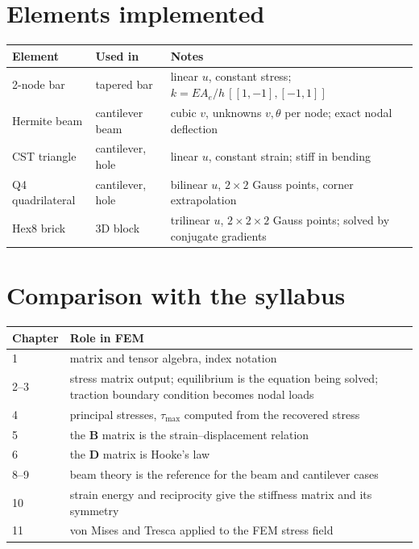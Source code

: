 \documentclass[11pt,a4paper]{article}
\begin{document}
\section{Elements implemented}
\begin{center}\small
\begin{tabular}{@{}lll@{}}\toprule
Element & Used in & Notes\\\midrule
2-node bar & tapered bar & linear $u$, constant stress; $k=EA_e/h\,[[1,-1],[-1,1]]$\\
Hermite beam & cantilever beam & cubic $v$, unknowns $v,\theta$ per node; exact nodal deflection\\
CST triangle & cantilever, hole & linear $u$, constant strain; stiff in bending\\
Q4 quadrilateral & cantilever, hole & bilinear $u$, $2\times2$ Gauss points, corner extrapolation\\
Hex8 brick & 3D block & trilinear $u$, $2\times2\times2$ Gauss points; solved by conjugate gradients\\\bottomrule
\end{tabular}
\end{center}

\section{Comparison with the syllabus}
\begin{center}\small
\begin{tabular}{@{}lp{9cm}@{}}\toprule
Chapter & Role in FEM\\\midrule
1 & matrix and tensor algebra, index notation\\
2--3 & stress matrix output; equilibrium is the equation being solved; traction boundary condition becomes nodal loads\\
4 & principal stresses, $\tau_{\max}$ computed from the recovered stress\\
5 & the $\mathbf{B}$ matrix is the strain--displacement relation\\
6 & the $\mathbf{D}$ matrix is Hooke's law\\
8--9 & beam theory is the reference for the beam and cantilever cases\\
10 & strain energy and reciprocity give the stiffness matrix and its symmetry\\
11 & von Mises and Tresca applied to the FEM stress field\\\bottomrule
\end{tabular}
\end{center}
\end{document}
